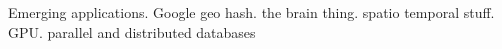Emerging applications. Google geo hash. the brain thing. spatio temporal stuff. GPU.
parallel and distributed databases
